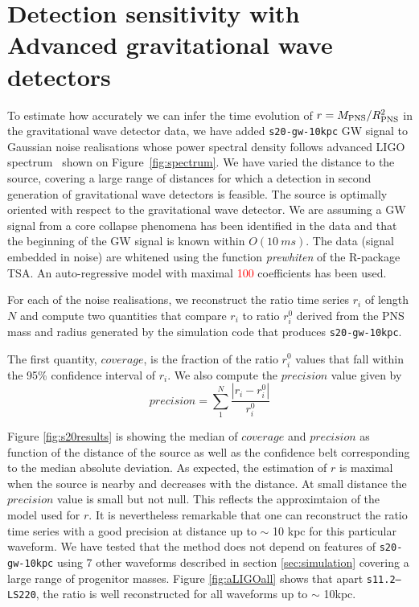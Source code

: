 \section{Detection sensitivity with Advanced gravitational wave detectors}
\label{sec:results}

To estimate how accurately we can infer the time evolution of $r=M_{\rm PNS}/R_{\rm PNS}^2$ in the
gravitational wave detector data, we have added {\tt s20-gw-10kpc} GW signal to 
Gaussian noise realisations whose power spectral density follows advanced LIGO
spectrum~\cite{aLIGOsens:2018} shown on Figure~\ref{fig:spectrum}. 
We have varied the distance to the source, covering a large
range of distances for which a detection in second generation of gravitational wave detectors
is feasible. The source is optimally oriented with
respect to the gravitational wave detector. We are assuming a GW signal from a core collapse
phenomena has been identified in the data and that the beginning of the GW signal is known within $O(10~ms)$.
The data (signal embedded in noise) are whitened using the function {\it prewhiten} of the R-package TSA.
An auto-regressive model with maximal \textcolor{red}{100} coefficients has been used.    

For each of the noise realisations, we reconstruct the ratio time series {$r_i$}
of length $N$ and compute two quantities that compare {$r_i$} to ratio {$r_i^0$} derived from
the PNS mass and radius generated by the simulation code that produces {\tt s20-gw-10kpc}.

The first quantity, $coverage$, is the fraction of the
ratio {$r_i^0$} values that fall within the 95\% confidence interval of {$r_i$}.
We also compute the $precision$ value given by
\begin{equation}
precision=\sum_1^N\frac{|r_i-r_i^0|}{r_i^0}
\end{equation}

Figure \ref{fig:s20results} is showing the median of $coverage$ and $precision$ as
function of the distance of the source as well as the confidence belt corresponding
to the median absolute deviation. As expected, the estimation of $r$ is maximal when
the source is nearby and decreases with the distance. At small distance the $precision$
value is small but not null. This reflects the approximtaion of the model used for $r$.
It is nevertheless remarkable that one can reconstruct the ratio time series with a good
precision at distance up to $\sim$ 10 kpc for this particular waveform. We have tested
that the method does not depend on features of {\tt s20-gw-10kpc} using 7 other waveforms
described in section \ref{sec:simulation} covering a large range of progenitor masses.
Figure \ref{fig:aLIGOall} shows that apart {\tt s11.2--LS220}, the ratio is well
reconstructed for all waveforms up to $\sim$ 10kpc. 


